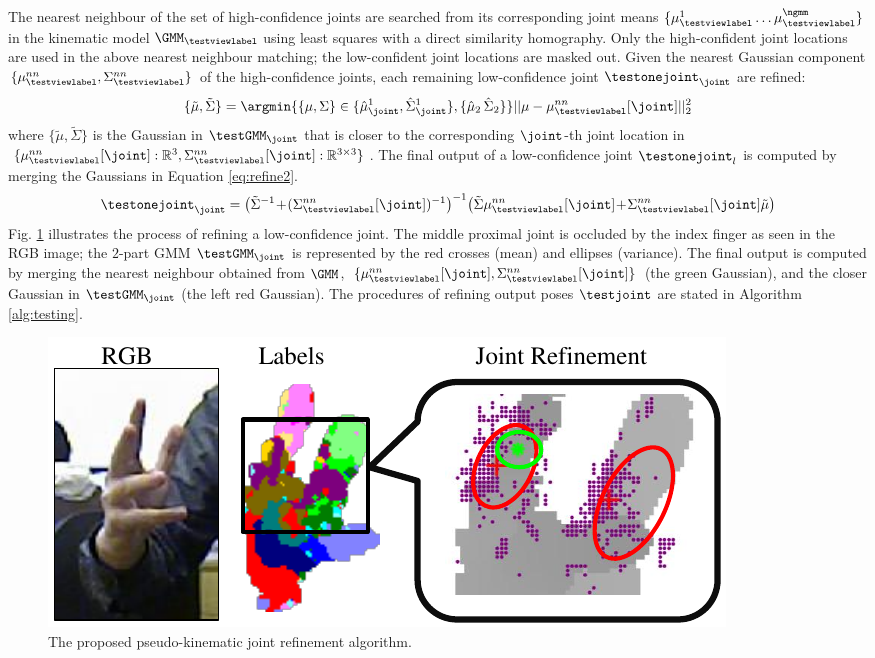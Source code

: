 The nearest neighbour of the set of high-confidence joints are searched from its corresponding joint means $\{\mu_{\testviewlabel}^{1}\dots\mu_{\testviewlabel}^{\ngmm}\}$ in the kinematic model $\GMM_{\testviewlabel}$ using least squares with a direct similarity homography. Only the high-confident joint locations are used in the above nearest neighbour matching; the low-confident joint locations are masked out. 
Given the nearest Gaussian component $\{\mu_{\testviewlabel}^{nn}, \Sigma_{\testviewlabel}^{nn}\}$ of the high-confidence joints, each remaining low-confidence joint $\testonejoint_{\joint}$ are refined: 
\begin{equation}
		\{\tilde{\mu}, \tilde{\Sigma}\} 
		= \argmin{\{\mu, \Sigma\} \in \{\hat{\mu}_{\joint}^{1}, \hat{\Sigma}_{\joint}^{1}\},  \{\hat{\mu}_{2}\, \hat{\Sigma}_{2}\}}  
		||\mu - \mu_{\testviewlabel}^{nn}[\joint]||^2_2
		\label{eq:refine1}
\end{equation}
where $\{\tilde{\mu}, \tilde{\Sigma}\}$ is the Gaussian in $\testGMM_{\joint}$ that is closer to the corresponding $\joint$-th joint location in $\{\mu_{\testviewlabel}^{nn}[\joint]:\mathbb{R}^{3}, \Sigma_{\testviewlabel}^{nn}[\joint]:\mathbb{R}^{3\times3}\}$. The final output of a low-confidence joint $\testonejoint_{l}$ is computed by merging the Gaussians in Equation \ref{eq:refine2}. 
\begin{equation}
	\testonejoint_{\joint} =
	\left(\tilde{\Sigma}^{-1}\!+\!(\Sigma_{\testviewlabel}^{nn}[\joint])^{-1}\right)^{-1}\! \left( \tilde{\Sigma} \mu_{\testviewlabel}^{nn}[\joint]\!+\!\Sigma_{\testviewlabel}^{nn}[\joint]\tilde{\mu}\right) 
	\label{eq:refine2}
\end{equation}
Fig. \ref{fig/hand/refine} illustrates the process of refining a low-confidence joint. The middle
proximal joint is occluded by the index finger as seen in the RGB image; the $2$-part GMM $\testGMM_{\joint}$ is represented by the red crosses (mean) and ellipses (variance). The final output is computed by merging the nearest neighbour obtained from $\GMM$, \ie $\{\mu_{\testviewlabel}^{nn}[\joint], \Sigma_{\testviewlabel}^{nn}[\joint]\}$ (the green Gaussian), and the closer Gaussian in $\testGMM_{\joint}$ (the left red Gaussian).  
The procedures of refining output poses $\testjoint$ are stated in Algorithm \ref{alg:testing}.  

\begin{figure}[ht]
	\centering
	\includegraphics[width=0.8\linewidth]{fig/hand/fig3.pdf}
	\caption{The proposed pseudo-kinematic joint refinement algorithm.}
	\label{fig/hand/refine}
\end{figure}

